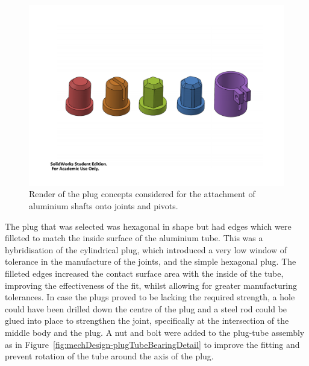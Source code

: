         \begin{figure}
        \centering
        \includegraphics[clip, trim=3cm 6cm 3cm 6cm, width=1\linewidth]{figures/plug-concepts}
        \caption[Render of the plug concepts considered for the attachment of aluminium shafts onto joints and pivots.]{Render of the plug concepts considered for the attachment of aluminium shafts onto joints and pivots.}
        \label{fig:mechDesign-plugConcepts}
        \end{figure}
        
        
        The plug that was selected was hexagonal in shape but had edges which were filleted to match the inside surface of the aluminium tube. This was a hybridisation of the cylindrical plug, which introduced a very low window of tolerance in the manufacture of the joints, and the simple hexagonal plug. The filleted edges increased the contact surface area with the inside of the tube, improving the effectiveness of the fit, whilst allowing for greater manufacturing tolerances. In case the plugs proved to be lacking the required strength, a hole could have been drilled down the centre of the plug and a steel rod could be glued into place to strengthen the joint, specifically at the intersection of the middle body and the plug. A nut and bolt were added to the plug-tube assembly as in Figure~\ref{fig:mechDesign-plugTubeBearingDetail} to improve the fitting and prevent rotation of the tube around the axis of the plug.
        
